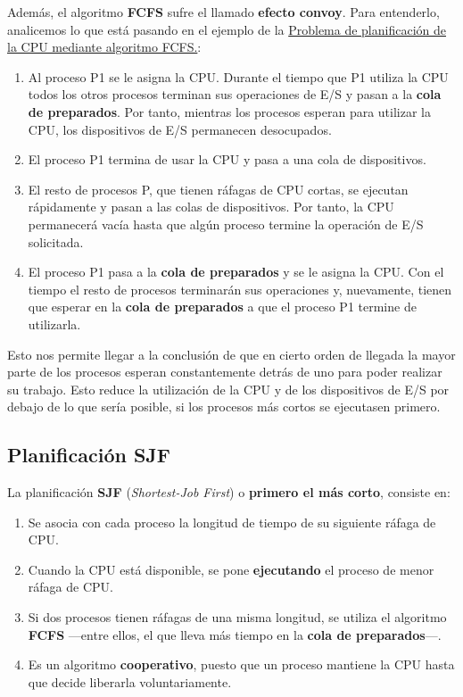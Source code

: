 Además, el algoritmo \textbf{FCFS} sufre el llamado \textbf{{}efecto
convoy}. Para entenderlo, analicemos lo que está pasando en el ejemplo
de la \hyperref[tabla-problema-fcfs]{Problema de planificación de la CPU
mediante algoritmo FCFS.}:

\begin{enumerate}
\def\labelenumi{\arabic{enumi}.}
\item
  Al proceso P1 se le asigna la CPU. Durante el tiempo que P1 utiliza la
  CPU todos los otros procesos terminan sus operaciones de E/S y pasan a
  la \textbf{cola de preparados}. Por tanto, mientras los procesos
  esperan para utilizar la CPU, los dispositivos de E/S permanecen
  desocupados.
\item
  El proceso P1 termina de usar la CPU y pasa a una cola de
  dispositivos.
\item
  El resto de procesos P, que tienen ráfagas de CPU cortas, se ejecutan
  rápidamente y pasan a las colas de dispositivos. Por tanto, la CPU
  permanecerá vacía hasta que algún proceso termine la operación de E/S
  solicitada.
\item
  El proceso P1 pasa a la \textbf{cola de preparados} y se le asigna la
  CPU. Con el tiempo el resto de procesos terminarán sus operaciones y,
  nuevamente, tienen que esperar en la \textbf{cola de preparados} a que
  el proceso P1 termine de utilizarla.
\end{enumerate}

Esto nos permite llegar a la conclusión de que en cierto orden de
llegada la mayor parte de los procesos esperan constantemente detrás de
uno para poder realizar su trabajo. Esto reduce la utilización de la CPU
y de los dispositivos de E/S por debajo de lo que sería posible, si los
procesos más cortos se ejecutasen primero.

\subsection{Planificación SJF}\label{_planificaciuxf3n_sjf}

{} La planificación \textbf{{}SJF} (\emph{Shortest-Job First}) o
\textbf{primero el más corto}, consiste en:

\begin{enumerate}
\def\labelenumi{\arabic{enumi}.}
\item
  Se asocia con cada proceso la longitud de tiempo de su siguiente
  ráfaga de CPU.
\item
  Cuando la CPU está disponible, se pone \textbf{ejecutando} el proceso
  de menor ráfaga de CPU.
\item
  Si dos procesos tienen ráfagas de una misma longitud, se utiliza el
  algoritmo \textbf{FCFS} ---entre ellos, el que lleva más tiempo en la
  \textbf{cola de preparados}---.
\item
  Es un algoritmo \textbf{cooperativo}, puesto que un proceso mantiene
  la CPU hasta que decide liberarla voluntariamente.
\end{enumerate}

